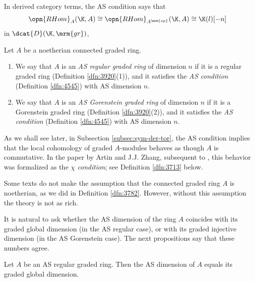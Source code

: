 In derived category terms, the AS condition says that 
\begin{equation} \label{eqn:4562}
\opn{RHom}_A(\K, A) \cong \opn{RHom}_{A^{\mrm{op}}}(\K, A) 
\cong \K(l)[-n]
\end{equation}
in $\dcat{D}(\K, \mrm{gr})$, 

\begin{dfn} \label{dfn:3782} 
Let $A$ be a noetherian connected graded ring. 
\begin{enumerate}
\item We say that $A$ is an {\em AS regular graded ring} 
of dimension $n$ if it
is a regular graded ring (Definition \ref{dfn:3920}(1)), and it 
satisfies the {\em AS condition} (Definition \ref{dfn:4545}) with AS dimension 
$n$. 

\item We say that $A$ is an {\em AS Gorenstein graded ring} 
of dimension $n$ if 
it is a Gorenstein graded ring (Definition \ref{dfn:3920}(2)), and it 
satisfies the {\em AS condition} (Definition \ref{dfn:4545}) with AS dimension 
$n$. 
\end{enumerate}
\end{dfn}

As we shall see later, in Subsection \ref{subsec:sym-der-tor}, the AS 
condition implies that the local cohomology of graded $A$-modules behaves as 
though $A$ is commutative. In the paper \cite{ArZh} by Artin and J.J. Zhang, 
subsequent to \cite{ArSchl}, this behavior was formalized as the {\em $\chi$ 
condition}; see Definition \ref{dfn:3713} below. 

Some texts do not make the assumption that the connected graded ring $A$ is 
noetherian, as we did in Definition \ref{dfn:3782}. However, without 
this assumption the theory is not as rich.  

It is natural to ask whether the AS dimension of the ring $A$ coincides 
with its graded global dimension (in the AS regular case), or with its 
graded injective dimension (in the AS Gorenstein case). The next 
propositions say that these numbers agree. 

\begin{prop} \label{prop:4560}
Let $A$ be an AS regular graded ring.
Then the AS dimension of $A$ equals its graded global dimension. 
\end{prop}

